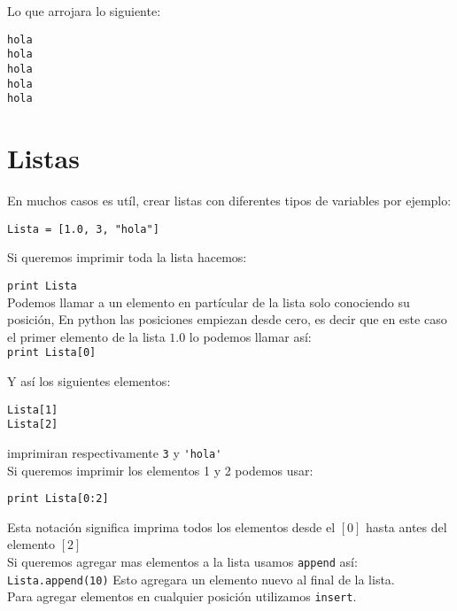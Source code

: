 \documentclass[12pt]{article}
\begin{document}
Lo que arrojara lo siguiente:

\begin{verbatim}
hola
hola
hola
hola
hola
\end{verbatim}

\section{Listas}

En muchos casos es ut\'il, crear listas con diferentes tipos de variables por ejemplo: 

\begin{verbatim}
Lista = [1.0, 3, "hola"]
\end{verbatim}

Si queremos imprimir toda la lista hacemos: 

\verb"print Lista" \\

Podemos llamar a un elemento en part\'icular de la lista solo conociendo su posici\'on, En python las posiciones empiezan desde
cero, es decir que en este caso el primer elemento de la lista $1.0$ lo podemos llamar as\'i:\\

\verb"print Lista[0]" 

Y as\'i los siguientes elementos:\\

\begin{verbatim}
Lista[1]
Lista[2] 
\end{verbatim}

imprimiran respectivamente \verb"3" y \verb"'hola'" \\

Si queremos imprimir los elementos 1 y 2 podemos usar: 

\begin{verbatim}
print Lista[0:2]
\end{verbatim}

Esta notaci\'on significa imprima  todos los elementos desde el $[0]$ hasta antes del elemento $[2]$ \\

Si queremos agregar mas elementos a la lista usamos \verb+append+ as\'i:\\

\verb+Lista.append(10)+ Esto agregara un elemento nuevo al final de la lista.\\

Para agregar elementos en cualquier posici\'on utilizamos \verb+insert+. \\
\end{document}
